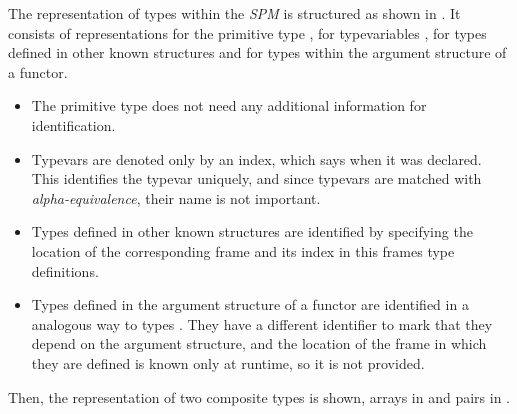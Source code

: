 The representation of types within the \emph{SPM} is structured as shown in .
It consists of representations for the primitive type , for typevariables , for types defined in other known structures and for types within the argument structure of a functor.
\begin{itemize}
\item The primitive type  does not need any additional information for identification.
\item Typevars  are denoted only by an index, which says when it was declared. 
This identifies the typevar uniquely, and since typevars are matched with \emph{alpha-equivalence}, their name is not important.
\item Types  defined in other known structures  are identified by specifying the location of the corresponding frame  and its index in this frames type definitions.
\item Types  defined in the argument structure of a functor are identified in a analogous way to types . 
They have a different identifier to mark that they depend on the argument structure, and the location of the frame in which they are defined is known only at runtime, so it is not provided.
\end{itemize}
Then, the representation of two composite types is shown, arrays \lsttext{[]} in  and pairs \lsttext{(,)} in .

